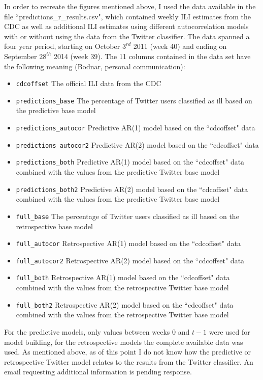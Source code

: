 \documentclass[11pt, a4paper,twoside]{report}\usepackage[]{graphicx}\usepackage[]{color}
\begin{document}
In order to recreate the figures mentioned above, I used the data available in the file ``predictions\_r\_results.csv", which contained weekly ILI estimates from the CDC as well as additional ILI estimates using different autocorrelation models with or without using the data from the Twitter classifier. The data spanned a four year period, starting on October $3^{rd}$ 2011 (week 40) and ending on September $28^{th}$ 2014 (week 39). The 11 columns contained in the data set have the following meaning (Bodnar, personal communication):

\begin{itemize}
  \item \texttt{cdcoffset} The official ILI data from the CDC
  \item \texttt{predictions\_base} The percentage of Twitter users classified as ill based on the predictive base model
  \item \texttt{predictions\_autocor} Predictive AR(1) model based on the ``cdcoffset" data
  \item \texttt{predictions\_autocor2} Predictive AR(2) model based on the ``cdcoffset" data
  \item \texttt{predictions\_both} Predictive AR(1) model based on the ``cdcoffset" data combined with the values from the predictive Twitter base model
  \item \texttt{predictions\_both2} Predictive AR(2) model based on the ``cdcoffset" data combined with the values from the predictive Twitter base model
 \item \texttt{full\_base} The percentage of Twitter users classified as ill based on the retrospective base model
  \item \texttt{full\_autocor} Retrospective AR(1) model based on the ``cdcoffset" data
  \item \texttt{full\_autocor2} Retrospective AR(2) model based on the ``cdcoffset" data
  \item \texttt{full\_both} Retrospective AR(1) model based on the ``cdcoffset" data combined with the values from the retrospective Twitter base model
  \item \texttt{full\_both2} Retrospective AR(2) model based on the ``cdcoffset" data combined with the values from the retrospective Twitter base model
\end{itemize}

For the predictive models, only values between weeks $0$ and $t-1$ were used for model building, for the retrospective models the complete available data was used. As mentioned above, as of this point I do not know how the predictive or retrospective Twitter model relates to the results from the Twitter classifier. An email requesting additional information is pending response.
\end{document}
